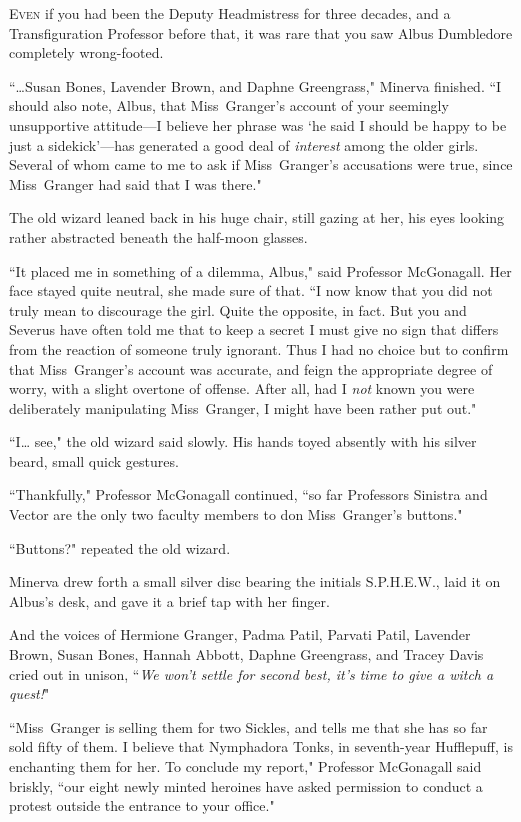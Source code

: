 
\lettrine{E}{ven} if you had been the Deputy Headmistress for three decades, and a Transfiguration Professor before that, it was rare that you saw Albus Dumbledore completely wrong-footed.

``{\ldots}Susan Bones, Lavender Brown, and Daphne Greengrass," Minerva finished. ``I should also note, Albus, that Miss~Granger's account of your seemingly unsupportive attitude---I believe her phrase was `he said I should be happy to be just a sidekick'---has generated a good deal of \emph{interest} among the older girls. Several of whom came to me to ask if Miss~Granger's accusations were true, since Miss~Granger had said that I was there."

The old wizard leaned back in his huge chair, still gazing at her, his eyes looking rather abstracted beneath the half-moon glasses.

``It placed me in something of a dilemma, Albus," said Professor McGonagall. Her face stayed quite neutral, she made sure of that. ``I now know that you did not truly mean to discourage the girl. Quite the opposite, in fact. But you and Severus have often told me that to keep a secret I must give no sign that differs from the reaction of someone truly ignorant. Thus I had no choice but to confirm that Miss~Granger's account was accurate, and feign the appropriate degree of worry, with a slight overtone of offense. After all, had I \emph{not} known you were deliberately manipulating Miss~Granger, I might have been rather put out."

``I{\ldots} see," the old wizard said slowly. His hands toyed absently with his silver beard, small quick gestures.

``Thankfully," Professor McGonagall continued, ``so far Professors Sinistra and Vector are the only two faculty members to don Miss~Granger's buttons."

``Buttons?" repeated the old wizard.

Minerva drew forth a small silver disc bearing the initials S.P.H.E.W., laid it on Albus's desk, and gave it a brief tap with her finger.

And the voices of Hermione Granger, Padma Patil, Parvati Patil, Lavender Brown, Susan Bones, Hannah Abbott, Daphne Greengrass, and Tracey Davis cried out in unison, ``\emph{We won't settle for second best, it's time to give a witch a quest!}"

``Miss~Granger is selling them for two Sickles, and tells me that she has so far sold fifty of them. I believe that Nymphadora Tonks, in seventh-year Hufflepuff, is enchanting them for her. To conclude my report," Professor McGonagall said briskly, ``our eight newly minted heroines have asked permission to conduct a protest outside the entrance to your office."

